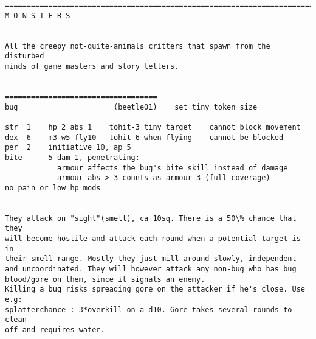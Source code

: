 \goodbreak \begin{samepage} \small \begin{verbatim}
================================================================================
M O N S T E R S
---------------

All the creepy not-quite-animals critters that spawn from the disturbed
minds of game masters and story tellers.


===================================
bug                      (beetle01)    set tiny token size
-----------------------------------
str  1    hp 2 abs 1    tohit-3 tiny target    cannot block movement
dex  6    m3 w5 fly10   tohit-6 when flying    cannot be blocked
per  2    initiative 10, ap 5
bite      5 dam 1, penetrating:
            armour affects the bug's bite skill instead of damage
            armour abs > 3 counts as armour 3 (full coverage)
no pain or low hp mods
-----------------------------------

They attack on "sight"(smell), ca 10sq. There is a 50\% chance that they
will become hostile and attack each round when a potential target is in
their smell range. Mostly they just mill around slowly, independent
and uncoordinated. They will however attack any non-bug who has bug
blood/gore on them, since it signals an enemy.
Killing a bug risks spreading gore on the attacker if he's close. Use e.g:
splatterchance : 3*overkill on a d10. Gore takes several rounds to clean
off and requires water.
\end{verbatim} \normalsize \end{samepage}

\

